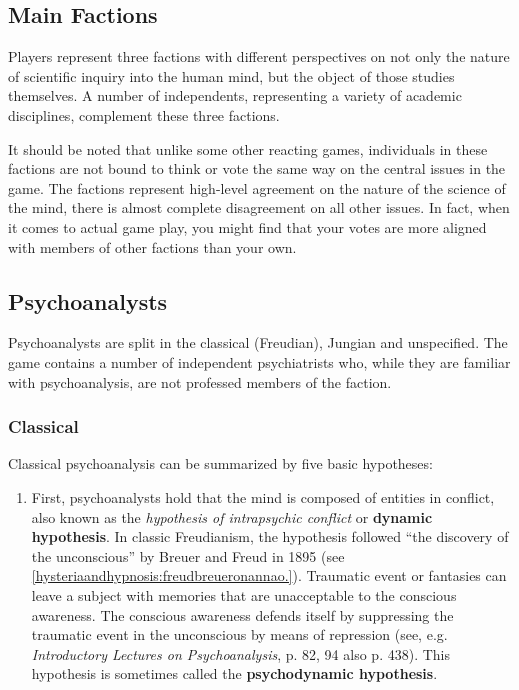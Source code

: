 \begin{refsection}
\section{Main Factions}
\label{mainfactions}

Players represent three factions with different perspectives on not only the nature of scientific inquiry into the human mind, but the object of those studies themselves. A number of independents, representing a variety of academic disciplines, complement these three factions.

It should be noted that unlike some other reacting games, individuals in these factions are not bound to think or vote the same way on the central issues in the game. The factions represent high-level agreement on the nature of the science of the mind, there is almost complete disagreement on all other issues. In fact, when it comes to actual game play, you might find that your votes are more aligned with members of other factions than your own.

\subsection{Psychoanalysts}
\label{psychoanalysts}

Psychoanalysts are split in the classical (Freudian), Jungian and unspecified. The game contains a number of independent psychiatrists who, while they are familiar with psychoanalysis, are not professed members of the faction.

\subsubsection{Classical}
\label{classical}

Classical psychoanalysis can be summarized by five basic hypotheses:

\begin{enumerate}
\item First, psychoanalysts hold that the mind is composed of entities in conflict, also known as the \emph{hypothesis of intrapsychic conflict} or \textbf{dynamic hypothesis}. In classic Freudianism, the hypothesis followed “the discovery of the unconscious” by Breuer and Freud in 1895 (see \ref{hysteriaandhypnosis:freudbreueronannao.}). Traumatic event or fantasies can leave a subject with memories that are unacceptable to the conscious awareness. The conscious awareness defends itself by suppressing the traumatic event in the unconscious by means of repression (see, e.g. \emph{Introductory Lectures on Psychoanalysis}, p. 82, 94 also p. 438). This hypothesis is sometimes called the \textbf{psychodynamic hypothesis}.


\end{enumerate}
\end{refsection}
